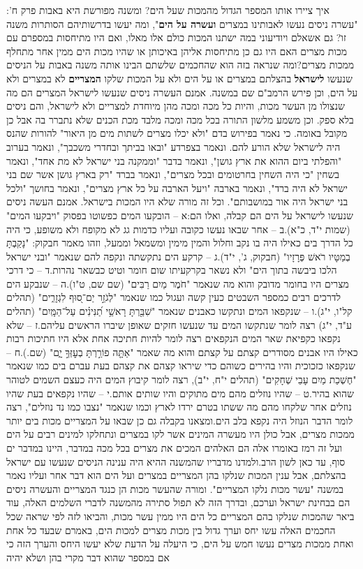 \documentclass[12pt, openany]{book}
\begin{document}
איך ציירו אותו המספר הגדול מהמכות שעל הים? ומשנה מפורשת היא באבות פרק ח': "עשרה ניסים נעשו לאבותינו במצרים \textrm{\textbf{ועשרה על הים}}", ומה יעשו בדרשותיהם הסותרות משנה זו? גם אשאלם ויודיעוני במה ישתנו המכות כולם אלו מאלו, ואם היו מתיחסות במספרם עם מכות מצרים האם היו גם כן מתיחסות אליהן באיכותן או שהיו מכות הים ממין אחר מתחלף ממכות מצרים?ומה שנראה בזה הוא שהחכמים שלשתם הבינו אותה משנה באבות על הניסים שנעשו \textrm{\textbf{לישראל}} בהצלתם במצרים או על הים ולא על המכות שלקו \textrm{\textbf{המצריים}} לא במצרים ולא על הים, וכן פירש הרמב"ם שם במשנה. אמנם העשרה ניסים שנעשו לישראל המצרים הם מה שנצולו מן העשר מכות, והיות כל מכה ומכה מהן מיוחדת למצריים ולא לישראל, והם ניסים בלא ספק. וכן משמע מלשון התורה בכל מכה ומכה מלבד מכת הכנים שלא נתברר בה אבל כן מקובל באומה. כי נאמר בפירוש בדם "ולא יכלו מצרים לשתות מים מן היאור" להורות שהנס היה לישראל שלא הורע להם. ונאמר בצפרדע "ובאו בביתך ובחדרי משכבך", ונאמר בערוב "והפלתי ביום ההוא את ארץ גושן", ונאמר בדבר "וממקנה בני ישראל לא מת אחד", ונאמר בשחין "כי היה השחין בחרטומים ובכל מצרים", ונאמר בברד "רק בארץ גושן אשר שם בני ישראל לא היה ברד", ונאמר בארבה "ויעל הארבה על כל ארץ מצרים", ונאמר בחושך "ולכל בני ישראל היה אור במושבותם". וכל זה מורה שלא היו המכות בישראל. אמנם העשה ניסים שנעשו לישראל על הים הם קבלה, ואלו הם:א – הובקעו המים כפשוטו בפסוק "ויבקעו המים" (שמות י"ד, כ"א).ב – אחר שבאו נעשו כקובה ועליו כדמות גג לא מקופח ולא משופע, כי היה כל הדרך בים כאילו היה בו נקב וחלול והמין מימין ומשמאל וממעל, וזהו מאמר חבקוק: "נָקַבְתָּ בְמַטָּיו רֹאשׁ  פְּרָזָיו" (חבקוק, ג', י"ד).ג – קרקע הים נתקשתה ונקפה להם שנאמר "ובני ישראל הלכו ביבשה בתוך הים" ולא נשאר בקרקעיתו שום חומר וטיט כבשאר נהרות.ד – כי דרכי מצרים היו בחומר מדובק והוא מה שנאמר "חֹמֶר מַיִם רַבִּים" (שם שם, ט"ו).ה – שנבקע הים לדרכים רבים כמספר השבטים כעין קשה ועגול כמו שנאמר "לְגֹזֵ֣ר יַם־ס֭וּף לִגְזָרִ֑ים" (תהלים קל"ו, י"ג).ו – שנקפאו המים ונתקשו כאבנים שנאמר "שִׁבַּ֖רְתָּ רָאשֵׁ֥י תַ֝נִּינִ֗ים עַל־הַמָּֽיִם" (תהלים ע"ד, י"ג) רצה לומר שנתקשו המים עד שנעשו חזקים שאופן שיברו הראשים עליהם.ז – שלא נקפאו כקפיאת שאר המים הנקפאים רצה לומר להיות חתיכה אחת אלא היו חתיכות רבות כאילו היו אבנים מסודרים קצתם על קצתם והוא מה שאמר "אַתָּ֤ה פוֹרַ֣רְתָּ בְעׇזְּךָ֣ יָ֑ם" (שם.).ח – שנקפאו כזכוכית והיו בהירים כשוהם כדי שיראו קצהם את קצהם בעת עברם בים כמו שנאמר "חֶשְׁכַת מַיִם עָבֵי שְׁחָקִים" (תהלים י"ח, י"ב), רצה לומר קיבוץ המים היה כעצם השמים לטוהר שהוא בהיר.ט – שהיו נוזלים מהם מים מתוקים והיו שותים אותם.י – שהיו נקפאים בעת שהיו נוזלים אחר שלקחו מהם מה ששתו בטרם ירדו לארץ וכמו שנאמר "נצבו כמו נד נוזלים", רצה לומר הדבר הנוזל היה נקפא בלב הים.ומצאנו בקבלה גם כן שבאו על המצריים מכות בים יותר ממכות מצרים, אבל כולן היו מעשרה המינים אשר לקו במצרים ונתחלקו למינים רבים על הים ועל זה רמז באומרו אלה הם האלהים המכים את מצרים בכל מכה במדבר, היינו במדבר ים סוף, עד כאן לשון הרב.ולמדנו מדבריו שהמשנה ההיא היה ענינה הניסים שנעשו עם ישראל בהצלתם, אבל ענין המכות שנלקו בהן המצריים במצרים ועל הים הוא דבר אחר ועליו נאמר במשנה "עשר מכות נלקו המצריים". ומורה שהעשר מכות הן כנגד המצריים והעשרה ניסים הם בבחינת ישראל וערכם, ובדרך הזה לא תפול סתירה מהמשנה לדברי השלמים האלה, עוד ביאר שהמכות שנלקו בהם המצריים כל הים היו ממין עשר מכות, והביאו לזה לפי שראה שכל החכמים האלה עשו יחס וערך גדול בין מכות מצרים למכות הים, באמרם שבעד כל אחת ואחת ממכות מצרים נעשו חמש על הים, כי היעלה על הדעת שלא יעשו היחס והערך הזה כי אם במספר שהוא דבר מקרי בהן ושלא יהיה 
\end{document}
